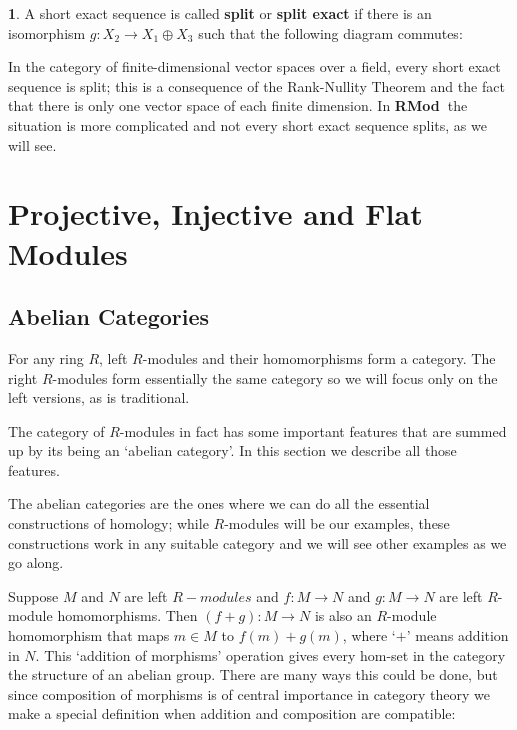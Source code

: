 \documentclass[oneside,english]{amsbook}
\numberwithin{section}{chapter}
\theoremstyle{plain}
\theoremstyle{definition}
\newtheorem{defn}[thm]{\protect\definitionname}
\providecommand{\definitionname}{Definition}
\newcommand{\catname}[1]{{\normalfont\textbf{#1}}}
\newcommand{\RMod}{\catname{RMod\ }}
\begin{document}
		\begin{defn}
			A short exact sequence is called \textbf{split} or \textbf{split exact} if there is an isomorphism $g: X_2\to X_1\oplus X_3$ such that the following diagram commutes:
			
			\begin{center}
			\end{center}
			
		\end{defn}
		
		In the category of finite-dimensional vector spaces over a field, every short exact sequence is split; this is a consequence of the Rank-Nullity Theorem and the fact that there is only one vector space of each finite dimension. In \RMod the situation is more complicated and not every short exact sequence splits, as we will see.
		
		
		
	\chapter{Projective, Injective and Flat Modules}

		\section{Abelian Categories}
	
			For any ring $R$, left $R$-modules and their homomorphisms form a category. The right $R$-modules form essentially the same category so we will focus only on the left versions, as is traditional.
			
			The category of $R$-modules in fact has some important features that are summed up by its being an `abelian category'. In this section we describe all those features. 
			
			The abelian categories are the ones where we can do all the essential constructions of homology; while $R$-modules will be our examples, these constructions work in any suitable category and we will see other examples as we go along.
	
			Suppose $M$ and $N$ are left $R-modules$ and $f:M\to N$ and $g:M\to N$ are left $R$-module homomorphisms. Then $(f+g):M\to N$ is also an $R$-module homomorphism that maps $m\in M$ to $f(m) + g(m)$, where `$+$' means addition in $N$. This `addition of morphisms' operation gives every hom-set in the category the structure of an abelian group. There are many ways this could be done, but since composition of morphisms is of central importance in category theory we make a special definition when addition and composition are compatible:
\end{document}
